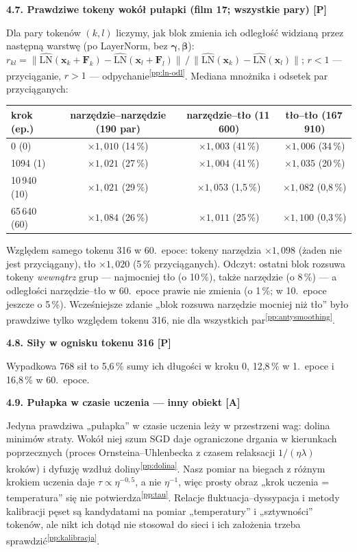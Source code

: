 \documentclass[a4paper,11pt]{article}
\newcommand{\stP}{\textcolor{pom}{\textsf{\textbf{[P]}}}}
\newcommand{\stA}{\textcolor{ana}{\textsf{\textbf{[A]}}}}
\newcommand{\LN}{\mathrm{LN}}
\newcounter{pn}
\newcommand{\pp}[1]{\textsuperscript{\ref{pp:#1}}}
\newcommand{\elem}[1]{\par\medskip\noindent\textbf{#1}\par\nopagebreak}
\begin{document}
\elem{4.7. Prawdziwe tokeny wokół pułapki (film 17; wszystkie pary) \stP}
Dla pary tokenów $(k,l)$ liczymy, jak blok zmienia ich odległość widzianą przez następną warstwę (po LayerNorm, bez $\bm\gamma,\bm\beta$):
$r_{kl}=\lVert\widehat{\LN}(\bm x_k+\bm F_k)-\widehat{\LN}(\bm x_l+\bm F_l)\rVert\,/\,\lVert\widehat{\LN}(\bm x_k)-\widehat{\LN}(\bm x_l)\rVert$;
$r<1$ --- przyciąganie, $r>1$ --- odpychanie\pp{ln-odl}. Mediana mnożnika i odsetek par przyciąganych:
\begin{center}\small
\begin{tabular}{lccc}\toprule
krok (ep.) & narzędzie--narzędzie (190 par) & narzędzie--tło (11\,600) & tło--tło (167\,910)\\\midrule
0 (0) & $\times1{,}010$ (14\,\%) & $\times1{,}003$ (41\,\%) & $\times1{,}006$ (34\,\%)\\
1094 (1) & $\times1{,}021$ (27\,\%) & $\times1{,}004$ (41\,\%) & $\times1{,}035$ (20\,\%)\\
10\,940 (10) & $\times1{,}021$ (29\,\%) & $\times1{,}053$ (1,5\,\%) & $\times1{,}082$ (0,8\,\%)\\
65\,640 (60) & $\times1{,}084$ (26\,\%) & $\times1{,}011$ (25\,\%) & $\times1{,}100$ (0,3\,\%)\\\bottomrule
\end{tabular}
\end{center}
Względem samego tokenu 316 w 60.~epoce: tokeny narzędzia $\times1{,}098$ (żaden nie jest przyciągany), tło $\times1{,}020$ (5\,\% przyciąganych).
Odczyt: ostatni blok rozsuwa tokeny \emph{wewnątrz} grup --- najmocniej tło (o 10\,\%), także narzędzie (o 8\,\%) --- a odległości
narzędzie--tło w 60.~epoce prawie nie zmienia (o 1\,\%; w 10.~epoce jeszcze o 5\,\%). Wcześniejsze zdanie „blok rozsuwa narzędzie mocniej
niż tło” było prawdziwe tylko względem tokenu 316, nie dla wszystkich par\pp{antysmoothing}.

\elem{4.8. Siły w ognisku tokenu 316 \stP}
Wypadkowa 768 sił to 5,6\,\% sumy ich długości w kroku 0, 12,8\,\% w 1.~epoce i 16,8\,\% w 60.~epoce.

\elem{4.9. Pułapka w czasie uczenia --- inny obiekt \stA}
Jedyna prawdziwa „pułapka” w czasie uczenia leży w przestrzeni wag: dolina minimów straty. Wokół niej szum SGD daje ograniczone
drgania w kierunkach poprzecznych (proces Ornsteina--Uhlenbecka z czasem relaksacji $1/(\eta\lambda)$ kroków) i dyfuzję wzdłuż
doliny\pp{dolina}. Nasz pomiar na biegach z różnym krokiem uczenia daje $\tau\propto\eta^{-0{,}5}$, a nie $\eta^{-1}$, więc prosty obraz
„krok uczenia = temperatura” się nie potwierdza\pp{tau}. Relacje fluktuacja--dyssypacja i metody kalibracji pęset są kandydatami na
pomiar „temperatury” i „sztywności” tokenów, ale nikt ich dotąd nie stosował do sieci i ich założenia trzeba sprawdzić\pp{kalibracja}.
\end{document}

